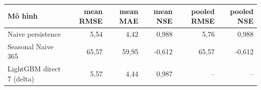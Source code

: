\begin{tabular}{lrrrrr}
\toprule
Mô hình & mean RMSE & mean MAE & mean NSE & pooled RMSE & pooled NSE \\
\midrule
Naive persistence & 5{,}54 & 4{,}42 & 0{,}988 & 5{,}76 & 0{,}988 \\
Seasonal Naive 365 & 65{,}57 & 59{,}95 & -0{,}612 & 65{,}57 & -0{,}612 \\
LightGBM direct 7 (delta) & 5{,}57 & 4{,}44 & 0{,}987 & -- & -- \\
\bottomrule
\end{tabular}
